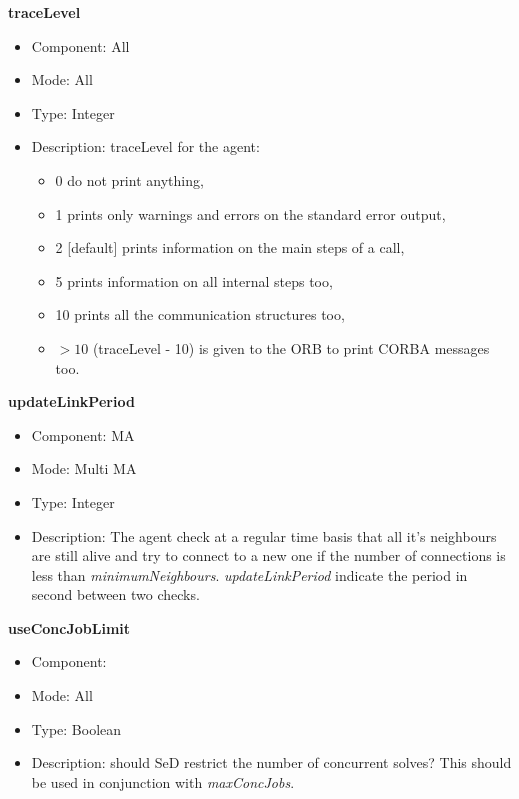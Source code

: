 \begin{description}
\item{\bf{traceLevel}}
  \begin{itemize}
  \item Component: All
    \item Mode: All
  \item Type: Integer
  \item Description: traceLevel for the \diet agent:
    \begin{itemize}
    \item  0 \diet do not print anything,
    \item  1 \diet prints only warnings and errors on the standard error
      output,
    \item 2 [default] \diet prints information on the main steps
      of a call,
    \item 5 \diet prints information on all internal steps too,
    \item 10 \diet prints all the communication structures too,
    \item $>10$ (traceLevel - 10) is given to the ORB to print CORBA messages
      too.
    \end{itemize}
  \end{itemize}

\item{\bf{updateLinkPeriod}}
  \begin{itemize}
  \item Component: MA
  \item Mode: Multi MA
  \item Type: Integer
  \item Description: The agent check at a regular time basis that all
    it's neighbours are still alive and try to connect to a new one if the
    number of connections is less than
    \emph{minimumNeighbours}. \emph{updateLinkPeriod} indicate the period
    in second between two checks.
  \end{itemize}

\item{\bf{useConcJobLimit}}
  \begin{itemize}
  \item Component: \sed
  \item Mode: All
  \item Type: Boolean
  \item Description: should SeD restrict the number of concurrent solves?
  This should be used in conjunction with \emph{maxConcJobs}. 
  \end{itemize}


\end{description}
